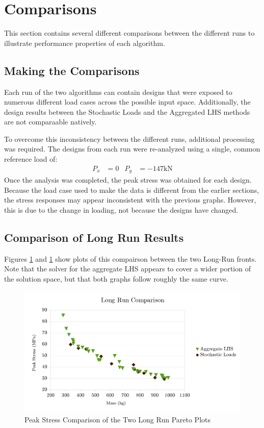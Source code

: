 \newpage
\section{Comparisons}
This section contains several different comparisons between the different runs to illustrate performance properties of each algorithm. 

\subsection{Making the Comparisons}
Each run of the two algorithms can contain designs that were exposed to numerous different load cases across the possible input space. Additionally, the design results between the Stochastic Loads and the Aggregated LHS methods are not comparaable natively. 

To overcome this inconsistency between the different runs, additional processing was required. The designs from each run were re-analyzed using a single, common reference load of: 
\begin{align*}
P_x &=0 &P_y &= -147 \text{kN}
\end{align*}
Once the analysis was completed, the peak stress was obtained for each design. Because the load case used to make the data is different from the earlier sections, the stress responses may appear inconsistent with the previous graphs. However, this is due to the change in loading, not because the designs have changed. 

\subsection{Comparison of Long Run Results}
Figures \ref{fig:pfront_comp_long} and \ref{fig:pfront_comp_long} show plots of this compairson between the two Long-Run fronts. Note that the solver for the aggregate LHS appears to cover a wider portion of the solution space, but that both graphs follow roughly the same curve. 

\begin{figure}[!htb]
\includegraphics[width=\textwidth]{img/pf_comp_long.png}
\caption{Peak Stress Comparison of the Two Long Run Pareto Plots}
\label{fig:pfront_comp_long}
\end{figure}

